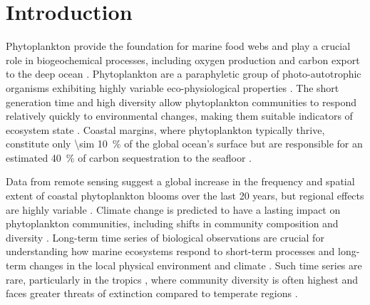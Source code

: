 \documentclass[draft]{agujournal2019}
\begin{document}



\section{Introduction}
%


    Phytoplankton provide the foundation for marine food webs and play a crucial role in biogeochemical processes, including oxygen production and carbon export to the deep ocean \cite{falkowski_biogeochemical_1998}. Phytoplankton are a paraphyletic group of photo-autotrophic organisms exhibiting highly variable eco-physiological properties \cite{appeltans_magnitude_2012}. The short generation time and high diversity allow phytoplankton communities to respond relatively quickly to environmental changes, making them suitable indicators of ecosystem state \cite{alvarez-cobelas_what_1998, barton_anthropogenic_2016, di_cavalho_temporal_2023}.
    Coastal margins, where phytoplankton typically thrive, constitute only \qty{\sim 10}{\%} of the global ocean's surface but are responsible for an estimated \qty{40}{\%} of carbon sequestration to the seafloor \cite{yool_examination_2001, mullerkarger_importance_2005}. 

    Data from remote sensing suggest a global increase in the frequency and spatial extent of coastal phytoplankton blooms over the last 20 years, but regional effects are highly variable \cite{dai_coastal_2023}.
    Climate change is predicted to have a lasting impact on phytoplankton communities, including shifts in community composition and diversity \cite{acevedo-trejos_glimpse_2014, boyd_biological_2016, henson_future_2021}. 
    Long-term time series of biological observations are crucial for understanding how marine ecosystems respond to short-term processes and long-term changes in the local physical environment and climate \cite{carstensen_need_2014, henson_observing_2016}. Such time series are rare, particularly in the tropics \cite{clarke_does_2017}, where community diversity is often highest \cite{brown_why_2014, righetti_global_2019} and faces greater threats of extinction compared to temperate regions \cite{finnegan_paleontological_2015}. 
\end{document}
